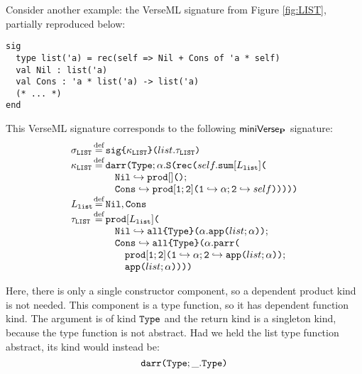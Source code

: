 Consider another example: the VerseML  signature from Figure \ref{fig:LIST}, partially reproduced below:
\begin{lstlisting}
sig 
  type list('a) = rec(self => Nil + Cons of 'a * self)
  val Nil : list('a)
  val Cons : 'a * list('a) -> list('a)
  (* ... *)
end
\end{lstlisting}
This VerseML signature corresponds to the following $\mathsf{miniVerse}_\textbf{P}$ signature:
\[
\arraycolsep=1px\begin{array}{ll}

\sigma_\texttt{LIST} & \defeq \asignature{\kappa_\texttt{LIST}}{list}{\tau_\texttt{LIST}}\\
\kappa_\texttt{LIST} & \defeq \akdarr{\akty}{\alpha}{\aksing{
  \arec{self}{
    \asum{L_\texttt{list}}{\\
    & \quad\quad 
      \mapitem{\lbltxt{Nil}}{\aprod{}{}}; \\
    & \quad\quad 
      \mapitem{\lbltxt{Cons}}{
        \aprod{\lbltxt{1}; \lbltxt{2}}{
          \mapitem{\lbltxt{1}}{\alpha}; 
          \mapitem{\lbltxt{2}}{self}
        }
      }
    }
  } 
}}\\
L_\texttt{list} & \defeq \lbltxt{Nil}, \lbltxt{Cons}\\
\tau_\texttt{LIST} & \defeq \aprod{L_\texttt{list}}{\\&
  \quad\quad \mapitem{\lbltxt{Nil}}{
    \aallu{\akty}{\alpha}{\acapp{list}{\alpha}}
  }; \\&
  \quad\quad \mapitem{\lbltxt{Cons}}{
    \aallu{\akty}{\alpha}{
      \aparr{\\&\quad\quad\quad
        \aprod{\lbltxt{1}; \lbltxt{2}}{
          \mapitem{\lbltxt{1}}{\alpha}; 
          \mapitem{\lbltxt{2}}{\acapp{list}{\alpha}}
        }
      }{\\&\quad\quad\quad
        \acapp{list}{\alpha}
      }
    }
  }
}
\end{array}
\]

Here, there is only a single constructor component, so a dependent product kind is not needed. This component is a type function, so it has dependent function kind. The argument is of kind $\texttt{Type}$ and the return kind is a singleton kind, because the type function is not abstract. Had we held the list type function abstract, its kind would instead be:
\[
\texttt{darr}\texttt{(}\texttt{Type}; \_.\texttt{Type}\texttt{)}
\]


